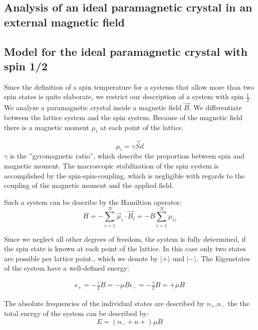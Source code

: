 \documentclass[12pt]{article}
\begin{document}
\begin{module}[id=mytemparature,uses=probability-intro]
\section{Analysis of an ideal paramagnetic crystal in an external magnetic field}
\subsection{Model for the ideal paramagnetic crystal with spin 1/2}

Since the definition of a spin temperature for a systems that allow more than
two spin states is quite elaborate, we restrict our description of
a system with spin $\frac{1}{2}$. We analyze a paramagnetic crystal
inside a magnetic field $\vec B$. We differentiate between the 
lattice system and the spin system. 
Because of the magnetic field there is a magnetic moment $\mu_{i}$ 
at each point of the lattice.

\begin{equation}
\mu_{i}=\gamma \vec S
d\end{equation}
$\gamma $ is the ''gyromagnetic ratio'', which describe the 
proportion between spin and magnetic moment.
The macroscopic stabilization of the spin system is accomplished 
by the spin-spin-coupling, which is negligible with regards to
the coupling of the magnetic moment and the applied field.

Such a system can be describe by the Hamiltion operator:
\begin{equation}
H=-\sum_{i=1}^{N} \vec \mu_{i} \cdot \vec B_{i}=-B \sum_{i=1}^{N} \mu_{iz}
\end{equation}

Since we neglect all other degrees of freedom, the system is fully determined,
if the spin state is known at each point of the lattice. In this case
only two states are possible per lattice point., which we denote
by $|+\rangle $ und $ |-\rangle $.
The Eigenstates of the system have a well-defined energy:
 
\begin{eqnarray}
\epsilon_{+}= - \frac{\gamma}{2}B=-\mu B
\epsilon_{-}= - \frac{\gamma}{2}B=+\mu B
\end{eqnarray}

The absolute frequencies of the individual states are described by $n_{+}$,$n_{-}$
the the total energy of the system can be described by:
\begin{equation}
E=(n_{-}+n{+})\mu B
\end{equation}


\end{module}
\end{document}
